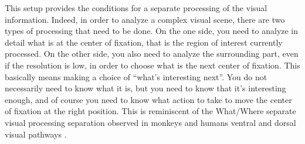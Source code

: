 This setup provides the conditions for a separate processing of the visual information.
Indeed, in order to analyze a complex visual scene, there are two types of processing that need to be done. On the one side, you need  to analyze in detail what is at the center of fixation, that is the region of interest currently processed. On the other side, you also need to analyze the surrounding part, even if the resolution is low, in order to choose what is the next center of fixation. This basically means making a choice of “what’s interesting next”. You do not necessarily need to know what it is, but you need to know that it’s interesting enough, and of course you need to know what action to take to move the center of fixation at the right position. This is reminiscent of the What/Where separate visual processing separation observed in monkeys and humans ventral and dorsal visual pathways \cite{mishkin1983object}.




